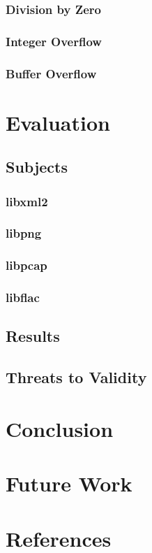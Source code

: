 \documentclass[a4paper]{scrartcl}
\begin{document}
\subsubsection{Division by Zero}
\subsubsection{Integer Overflow}
\subsubsection{Buffer Overflow}
\section{Evaluation}
\subsection{Subjects}
\subsubsection{libxml2}
\subsubsection{libpng}
\subsubsection{libpcap}
\subsubsection{libflac}
\subsection{Results}
\subsection{Threats to Validity}
\section{Conclusion}
\section{Future Work}
\newpage
\section*{References}
\renewcommand\refname{}


\newpage
\listoftodos[Notes]
\end{document}
